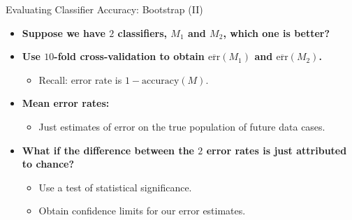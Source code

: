 \begin{frame}{Evaluating Classifier Accuracy: Bootstrap (II)}
	\begin{itemize}
		\item \textbf{Suppose we have $2$ classifiers, $M_1$ and $M_2$, which one is better?}
		\item \textbf{Use $10$-fold cross-validation to obtain $\overline{\text{err}}(M_1)$ and $\overline{\text{err}}(M_2)$.}
		      \begin{itemize}
			      \item Recall: error rate is $1-\text{accuracy}(M)$.
		      \end{itemize}
		\item \textbf{Mean error rates:}
		      \begin{itemize}
			      \item Just estimates of error on the true population of future data cases.
		      \end{itemize}
		\item \textbf{What if the difference between the $2$ error rates is just attributed to chance?}
		      \begin{itemize}
			      \item Use a test of statistical significance.
			      \item Obtain confidence limits for our error estimates.
		      \end{itemize}
	\end{itemize}
\end{frame}

